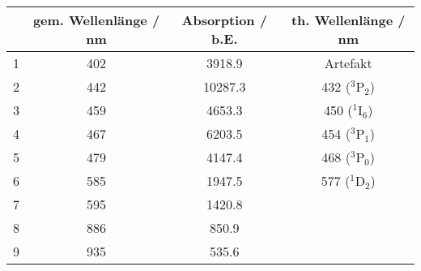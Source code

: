 \begin{center}
\begin{tabular}{|c|c|c|c|}
\hline
 & gem. Wellenlänge / nm & Absorption / b.E. & th. Wellenlänge / nm \\ \hline
1 & 402 & 3918.9 & Artefakt \\ \hline
2 & 442 & 10287.3 & 432 ($^3$P$_2$) \\ \hline
3 & 459 & 4653.3 & 450 ($^1$I$_6$) \\ \hline
4 & 467 & 6203.5 & 454 ($^3$P$_1$) \\ \hline
5 & 479 & 4147.4 & 468 ($^3$P$_0$) \\ \hline
6 & 585 & 1947.5 & 577 ($^1$D$_2$) \\ \hline
7 & 595 & 1420.8 &  \\ \hline
8 & 886 & 850.9 &  \\ \hline
9 & 935 & 535.6 &  \\ \hline
\end{tabular}
\end{center}